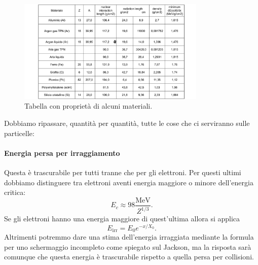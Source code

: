 \begin{figure}[H]
	\centering
	\includegraphics[width=0.8\textwidth]{immagini/materials.png}
	\caption{Tabella con proprietà di alcuni materiali.}
	\label{fig:}
\end{figure}

Dobbiamo ripassare, quantità per quantità, tutte le cose che ci serviranno sulle particelle:

\paragraph{Energia persa per irraggiamento}%
Questa è trascurabile per tutti tranne che per gli elettroni. Per questi ultimi dobbiamo distinguere tra elettroni aventi energia maggiore o minore dell'energia critica:
\[
	E_{c} \approx 98 \frac{\text{MeV}}{Z^{1 /3}}
.\] 
Se gli elettroni hanno una energia maggiore di quest'ultima allora si applica 
\[
	E_{\text{irr}}= E_0 e^{- x /X_0}
.\]
Altrimenti potremmo dare una stima dell'energia irraggiata mediante la formula per uno  schermaggio incompleto come spiegato sul Jackson, ma la risposta sarà comunque che questa energia è trascurabile rispetto a quella persa per collisioni.

